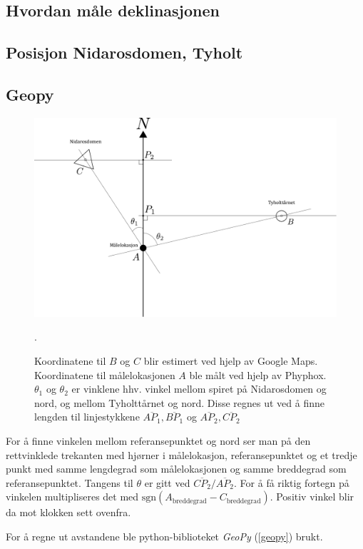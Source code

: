 \subsection{Hvordan måle deklinasjonen}

\subsection{Posisjon Nidarosdomen, Tyholt}

\subsection{Geopy}

\begin{figure}
    \centering
    \includegraphics[width=\textwidth]{img/angle_north.pdf}
    \caption{Koordinatene til $B$ og $C$ blir estimert ved hjelp av Google Maps. 
    Koordinatene til målelokasjonen $A$ ble målt ved hjelp av Phyphox.
    $\theta_1$ og $\theta_2$ er vinklene hhv. vinkel mellom spiret på Nidarosdomen og nord, og mellom Tyholttårnet og nord. 
    Disse regnes ut ved å finne lengden til linjestykkene $\overline{AP_1}, \overline{BP_1}$ og $\overline{AP_2}, \overline{CP_2}$}.
    \label{fig:angle_north}
\end{figure}

For å finne vinkelen mellom referansepunktet og nord ser man på den rettvinklede trekanten med hjørner i målelokasjon, referansepunktet og et tredje punkt med samme lengdegrad som målelokasjonen og samme breddegrad som referansepunktet.
Tangens til $\theta$ er gitt ved $\overline{CP_2} / \overline{AP_2}$.
For å få riktig fortegn på vinkelen multipliseres det med $\text{sgn}(A_{\text{breddegrad}} - C_{\text{breddegrad}})$. Positiv vinkel blir da mot klokken sett ovenfra.
\par
For å regne ut avstandene ble python-biblioteket \textit{GeoPy} (\ref{geopy}) brukt.

